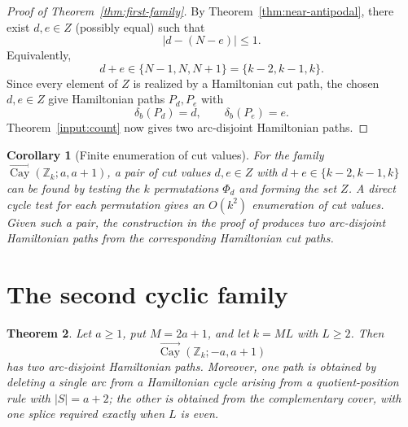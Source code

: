 \documentclass[11pt]{article}
\newtheorem{theorem}{Theorem}[section]
\newtheorem{corollary}[theorem]{Corollary}
\newcommand{\Cay}{\overrightarrow{\operatorname{Cay}}}
\newcommand{\Z}{\mathbb Z}
\begin{document}
\begin{proof}[Proof of Theorem~\ref{thm:first-family}]
By Theorem~\ref{thm:near-antipodal}, there exist $d,e\in Z$ (possibly equal) such that
\[
        |d-(N-e)|\le1.
\]
Equivalently,
\[
        d+e\in\{N-1,N,N+1\}=\{k-2,k-1,k\}.
\]
Since every element of $Z$ is realized by a Hamiltonian cut path, the chosen $d,e\in Z$ give Hamiltonian paths $P_d,P_e$ with
\[
        \delta_b(P_d)=d,
        \qquad
        \delta_b(P_e)=e.
\]
Theorem~\ref{input:count} now gives two arc-disjoint Hamiltonian paths.
\end{proof}


\begin{corollary}[Finite enumeration of cut values]\label{cor:cut-search}
For the family $\Cay(\Z_k;a,a+1)$, a pair of cut values $d,e\in Z$ with $d+e\in\{k-2,k-1,k\}$ can be found by testing the $k$ permutations $\Phi_d$ and forming the set $Z$.  A direct cycle test for each permutation gives an $O(k^2)$ enumeration of cut values.  Given such a pair, the construction in the proof of \cite[Proposition~4.3]{DMM} produces two arc-disjoint Hamiltonian paths from the corresponding Hamiltonian cut paths.
\end{corollary}

\section{The second cyclic family}\label{sec:second-family}

\begin{theorem}\label{thm:second-family}
Let $a\ge1$, put $M=2a+1$, and let $k=ML$ with $L\ge2$.  Then
\[
        \Cay(\Z_k;-a,a+1)
\]
has two arc-disjoint Hamiltonian paths.  Moreover, one path is obtained by deleting a single arc from a Hamiltonian cycle arising from a quotient-position rule with $|S|=a+2$; the other is obtained from the complementary cover, with one splice required exactly when $L$ is even.
\end{theorem}
\end{document}
